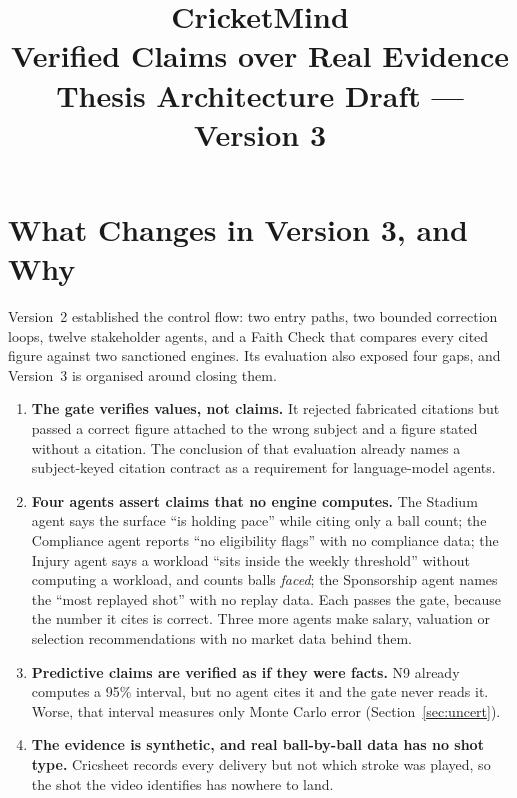 \documentclass[11pt,a4paper]{article}
\title{\textbf{CricketMind}\\[0.3em]
       \large Verified Claims over Real Evidence\\[0.2em]
       \normalsize Thesis Architecture Draft --- Version 3}
\author{}
\date{}
\begin{document}
\maketitle
\thispagestyle{empty}

\begin{center}
\end{center}

\section{What Changes in Version 3, and Why}

Version~2 established the control flow: two entry paths, two bounded correction
loops, twelve stakeholder agents, and a Faith Check that compares every cited
figure against two sanctioned engines. Its evaluation also exposed four gaps,
and Version~3 is organised around closing them.

\begin{enumerate}[leftmargin=1.6em]
\item \textbf{The gate verifies values, not claims.} It rejected fabricated
  citations but passed a correct figure attached to the wrong subject and a
  figure stated without a citation. The conclusion of that evaluation already
  names a subject-keyed citation contract as a requirement for language-model
  agents.
\item \textbf{Four agents assert claims that no engine computes.} The Stadium
  agent says the surface ``is holding pace'' while citing only a ball count;
  the Compliance agent reports ``no eligibility flags'' with no compliance data;
  the Injury agent says a workload ``sits inside the weekly threshold'' without
  computing a workload, and counts balls \emph{faced}; the Sponsorship agent
  names the ``most replayed shot'' with no replay data. Each passes the gate,
  because the number it cites is correct. Three more agents make salary,
  valuation or selection recommendations with no market data behind them.
\item \textbf{Predictive claims are verified as if they were facts.} N9 already
  computes a 95\% interval, but no agent cites it and the gate never reads it.
  Worse, that interval measures only Monte Carlo error
  (Section~\ref{sec:uncert}).
\item \textbf{The evidence is synthetic, and real ball-by-ball data has no shot
  type.} Cricsheet records every delivery but not which stroke was played, so
  the shot the video identifies has nowhere to land.
\end{enumerate}
\end{document}
